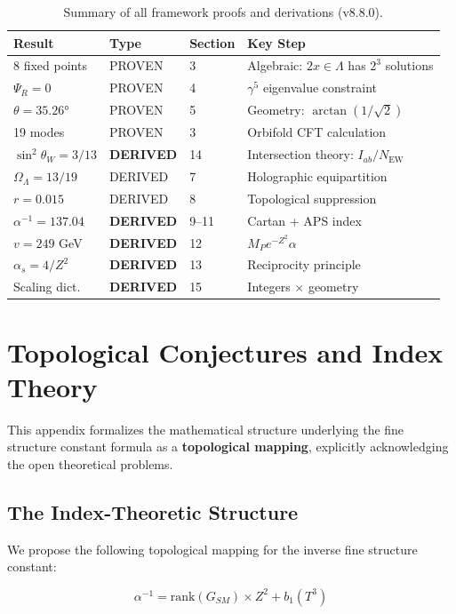 \documentclass[12pt,a4paper]{article}
\newcommand{\OmegaL}{\Omega_\Lambda}
\newcommand{\sinW}{\sin^2\theta_W}
\newcommand{\Zsq}{Z^2}
\begin{document}
\begin{table}[H]
\centering
\begin{tabular}{llll}
\toprule
\textbf{Result} & \textbf{Type} & \textbf{Section} & \textbf{Key Step} \\
\midrule
8 fixed points & PROVEN & 3 & Algebraic: $2x \in \Lambda$ has $2^3$ solutions \\
$\Psi_R = 0$ & PROVEN & 4 & $\gamma^5$ eigenvalue constraint \\
$\theta = 35.26°$ & PROVEN & 5 & Geometry: $\arctan(1/\sqrt{2})$ \\
19 modes & PROVEN & 3 & Orbifold CFT calculation \\
$\sinW = 3/13$ & \textbf{DERIVED} & 14 & Intersection theory: $I_{ab}/N_{\text{EW}}$ \\
$\OmegaL = 13/19$ & DERIVED & 7 & Holographic equipartition \\
$r = 0.015$ & DERIVED & 8 & Topological suppression \\
$\alpha^{-1} = 137.04$ & \textbf{DERIVED} & 9--11 & Cartan + APS index \\
$v = 249$ GeV & \textbf{DERIVED} & 12 & $M_P e^{-\Zsq} \alpha$ \\
$\alpha_s = 4/\Zsq$ & \textbf{DERIVED} & 13 & Reciprocity principle \\
Scaling dict. & \textbf{DERIVED} & 15 & Integers $\times$ geometry \\
\bottomrule
\end{tabular}
\caption{Summary of all framework proofs and derivations (v8.8.0).}
\end{table}

\section{Topological Conjectures and Index Theory}
\label{app:conjectures}

This appendix formalizes the mathematical structure underlying the fine structure constant formula as a \textbf{topological mapping}, explicitly acknowledging the open theoretical problems.

\subsection{The Index-Theoretic Structure}

We propose the following topological mapping for the inverse fine structure constant:

\begin{equation}
\boxed{\alpha^{-1} = \text{rank}(G_{SM}) \times \Zsq + b_1(T^3)}
\end{equation}
\end{document}
